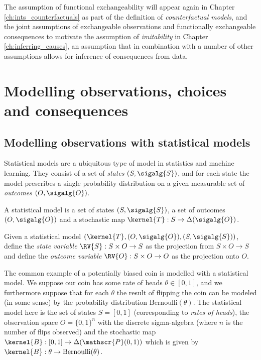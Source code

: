 The assumption of functional exchangeability will appear again in Chapter \ref{ch:ints_counterfactuals} as part of the definition of \emph{counterfactual models}, and the joint assumptions of exchangeable observations and functionally exchangeable consequences to motivate the assumption of \emph{imitability} in Chapter \ref{ch:inferring_causes}, an assumption that in combination with a number of other assumptions allows for inference of consequences from data.

\section{Modelling observations, choices and consequences}

\subsection{Modelling observations with statistical models}

Statistical models are a ubiquitous type of model in statistics and machine learning. They consist of a set of \emph{states} $(S,\sigalg{S})$, and for each state the model prescribes a single probability distribution on a given measurable set of \emph{outcomes} $(O,\sigalg{O})$.

\begin{definition}\label{def:statistical model}
A statistical model is a set of states $(S,\sigalg{S})$, a set of outcomes $(O,\sigalg{O})$ and a stochastic map $\kernel{T}:S\to \Delta(\sigalg{O})$.
\end{definition}

\begin{definition}\label{def:state_outcome}
Given a statistical model $(\kernel{T},(O,\sigalg{O}),(S,\sigalg{S}))$, define the \emph{state variable} $\RV{S}:S\times O\to S$ as the projection from $S\times O\to S$ and define the \emph{outcome variable} $\RV{O}:S\times O\to O$ as the projection onto $O$.
\end{definition}

The common example of a potentially biased coin is modelled with a statistical model. We suppose our coin has some rate of heads $\theta\in [0,1]$, and we furthermore suppose that for each $\theta$ the result of flipping the coin can be modeled (in some sense) by the probability distribution $\text{Bernoulli}(\theta)$. The statistical model here is the set of states $S=[0,1]$ (corresponding to \emph{rates of heads}), the observation space $O=\{0,1\}^n$ with the discrete sigma-algebra (where $n$ is the number of flips observed) and the stochastic map $\kernel{B}:[0,1]\to \Delta(\mathscr{P}(0,1))$ which is given by $\kernel{B}:\theta\to \text{Bernoulli}(\theta)$.

